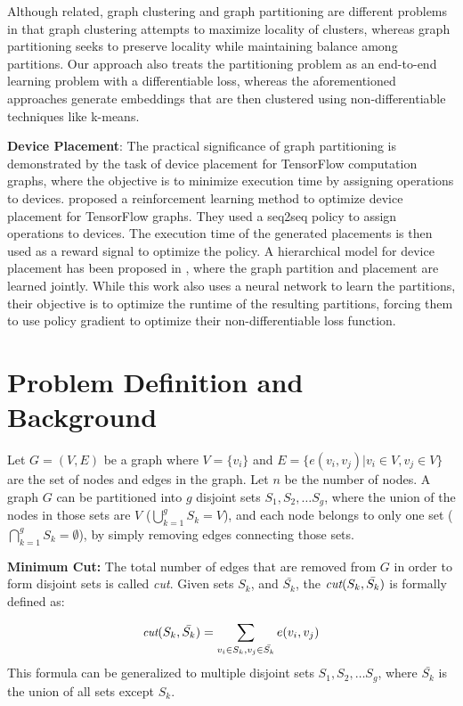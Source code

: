 \documentclass[10pt,twocolumn]{article}
\begin{document}
Although related, graph clustering and graph partitioning are different problems in that graph clustering attempts to maximize locality of clusters, whereas graph partitioning seeks to preserve locality while maintaining balance among partitions. Our approach also treats the partitioning problem as an end-to-end learning problem with a differentiable loss, whereas the aforementioned approaches generate embeddings that are then clustered using non-differentiable techniques like k-means.

\noindent\textbf{Device Placement}:
The practical significance of graph partitioning is demonstrated by the task of device placement for TensorFlow computation graphs, where the objective is to minimize execution time by assigning operations to devices. 
\cite{azalia_2017} proposed a reinforcement learning method to optimize device placement for TensorFlow graphs. They used a seq2seq policy to assign operations to devices.
The execution time of the generated placements is then used as a reward signal to optimize the policy. A hierarchical model for device placement has been proposed in \cite{azalia_2018}, where the graph partition and placement are learned jointly. While this work also uses a neural network to learn the partitions, their objective is to optimize the runtime of the resulting partitions, forcing them to use policy gradient to optimize their non-differentiable loss function. \section{Problem Definition and Background}
\label{sec:probDef}
Let $G=(V,E)$ be a graph where $V = \{v_i\}$ and $E = \{e(v_i, v_j) | v_i \in V, v_j \in V\}$ are the set of nodes and edges in the graph. Let $n$ be the number of nodes. A graph $G$ can be partitioned into $g$ disjoint sets $S_1, S_2, \dots S_g$, where the union of the nodes in those sets are $V$ ($\bigcup_{k=1}^{g} S_k = V$), and each node belongs to only one set ($\bigcap_{k=1}^{g} S_k = \emptyset$), by simply removing edges connecting those sets. 

\noindent\textbf{Minimum Cut:}
The total number of edges that are removed from $G$ in order to form disjoint sets is called \emph{cut}. Given sets $S_k$, and $\bar{S_k}$, the $\emph{cut}(S_k, \bar{S_k})$ is formally defined as:

\begin{equation} \label{equ:cut}
\small
\emph{cut}(S_k, \bar{S_k}) = \sum_{v_i\in S_k, v_j\in \bar{S_k}} e(v_i,v_j)
\end{equation}
This formula can be generalized to multiple disjoint sets $S_1, S_2, \dots S_g$, where $\bar{S_k}$ is the union of all sets except $S_k$.
\end{document}
